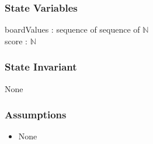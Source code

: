 \documentclass{article}
\begin{document}
\subsubsection*{State Variables}
boardValues : sequence of sequence of $\mathbb{N}$  \\
score : $\mathbb{N}$ 

\subsubsection*{State Invariant}
None

\subsubsection*{Assumptions}
\begin{itemize}
    \item None
\end{itemize}
\end{document}
